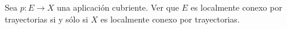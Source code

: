 \begin{ejercicio}
Sea $p \colon E \to X$ una aplicación cubriente. Ver que $E$ es localmente conexo por trayectorias si y sólo si $X$ es localmente conexo por trayectorias.
\end{ejercicio}

\begin{demostracion}

\end{demostracion}
